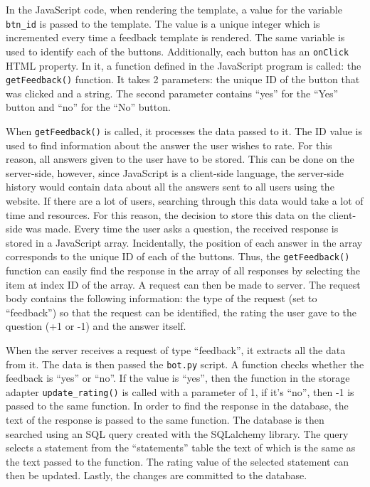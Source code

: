 \documentclass[12pt,a4paper]{article}
\begin{document}
In the JavaScript code, when rendering the template, a value for the variable \texttt{btn\_id} is passed to the template. The value is a unique integer which is incremented every time a feedback template is rendered. The same variable is used to identify each of the buttons. Additionally, each button has an \texttt{onClick} HTML property. In it, a function defined in the JavaScript program is called: the \texttt{getFeedback()} function. It takes 2 parameters: the unique ID of the button that was clicked and a string. The second parameter contains “yes” for the “Yes” button and “no” for the “No” button.

When \texttt{getFeedback()} is called, it processes the data passed to it. The ID value is used to find information about the answer the user wishes to rate. For this reason, all answers given to the user have to be stored. This can be done on the server-side, however, since JavaScript is a client-side language, the server-side history would contain data about all the answers sent to all users using the website. If there are a lot of users, searching through this data would take a lot of time and resources. For this reason, the decision to store this data on the client-side was made. Every time the user asks a question, the received response is stored in a JavaScript array. Incidentally, the position of each answer in the array corresponds to the unique ID of each of the buttons. Thus, the \texttt{getFeedback()} function can easily find the response in the array of all responses by selecting the item at index ID of the array. A request can then be made to server. The request body contains the following information: the type of the request (set to “feedback”) so that the request can be identified, the rating the user gave to the question (+1 or -1) and the answer itself. 

When the server receives a request of type “feedback”, it extracts all the data from it. The data is then passed the \texttt{bot.py} script. A function checks whether the feedback is “yes” or “no”. If the value is “yes”, then the function in the storage adapter \texttt{update\_rating()} is called with a parameter of 1, if it’s “no”, then -1 is passed to the same function. In order to find the response in the database, the text of the response is passed to the same function. The database is then searched using an SQL query created with the SQLalchemy library. The query selects a statement from the “statements” table the text of which is the same as the text passed to the function. The rating value of the selected statement can then be updated. Lastly, the changes are committed to the database.
\end{document}
